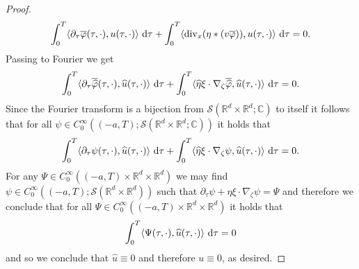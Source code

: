 \documentclass[11pt,reqno]{amsart}
\numberwithin{equation}{section}
\def\dd{{\rm d}}
\begin{document}
\begin{proof}
\begin{align*}
\int_{0}^{T}\langle \partial_{\tau}\overline{\varphi}(\tau,\cdot),u(\tau,\cdot)\rangle\ \dd \tau+\int_{0}^{T}\langle \mathrm{div}_{x}(\eta\ast (v\overline{\varphi})), u(\tau,\cdot)\rangle \ \dd \tau=0.    
\end{align*}
Passing to Fourier we get  
\begin{align*}
\int_{0}^{T}\langle \partial_{\tau}\overline{\widehat{\varphi}}(\tau,\cdot),\widehat{u}(\tau,\cdot)\rangle\ \dd \tau+\int_{0}^{T}\langle \widehat{\eta}\xi\cdot \nabla_{\zeta}\overline{\widehat{\varphi}},\widehat{u}(\tau,\cdot)\rangle\ \dd \tau=0.      
\end{align*}
Since the Fourier transform is a bijection from $\mathcal{S}(\mathbb{R}^{d}\times \mathbb{R}^{d};\mathbb{C})$ to itself it follows that for all $\psi\in C^{\infty}_{0}((-a,T);\mathcal{S}(\mathbb{R}^{d}\times \mathbb{R}^{d};\mathbb{C}))$
it holds that 
\begin{align*}
\int_{0}^{T}\langle \partial_{\tau}\psi(\tau,\cdot),\widehat{u}(\tau,\cdot)\rangle\ \dd \tau+\int_{0}^{T}\langle \widehat{\eta}\xi\cdot \nabla_{\zeta}\psi,\widehat{u}(\tau,\cdot)\rangle\ \dd \tau=0.      
\end{align*}
For any $\Psi\in  C^{\infty}_{0}((-a,T)\times \mathbb{R}^{d}\times \mathbb{R}^{d})$ we may find $\psi\in C^{\infty}_{0}((-a,T); \mathcal{S}(\mathbb{R}^{d}\times \mathbb{R}^{d}))$ such that $\partial_{\tau}\psi+\widehat{\eta}\xi\cdot \nabla_{\zeta}\psi=\Psi$ and therefore we conclude that for all $\Psi\in C^{\infty}_{0}((-a,T)\times \mathbb{R}^{d}\times \mathbb{R}^{d})$ it holds that 
\begin{align*}
\int_{0}^{T}\langle \Psi(\tau,\cdot),\widehat{u}(\tau,\cdot)\rangle\ \dd \tau=0      
\end{align*}
and so we conclude that $\widehat{u}\equiv 0$ and therefore $u\equiv 0$, as desired. 
\end{proof}
\end{document}
